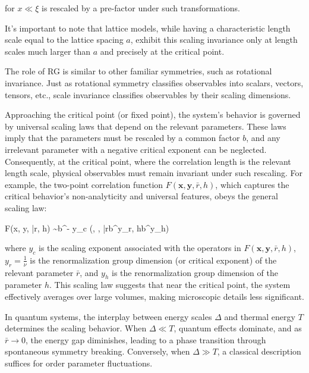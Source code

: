 for $ x \ll \xi $ is rescaled by a pre-factor under such transformations.


It's important to note that lattice models, while having a characteristic length scale equal to the lattice spacing $ a $, exhibit this scaling invariance only at length scales much larger than $ a $ and precisely at the critical point.


The role of RG is similar to other familiar symmetries, such as rotational invariance. Just as rotational symmetry classifies observables into scalars, vectors, tensors, etc., scale invariance classifies observables by their scaling dimensions.

Approaching the critical point (or fixed point), the system's behavior is governed by universal scaling laws that depend on the relevant parameters. These laws imply that the parameters must be rescaled by a common factor $ b $, and any irrelevant parameter with a negative critical exponent can be neglected. Consequently, at the critical point, where the correlation length is the relevant length scale, physical observables must remain invariant under such rescaling. For example, the two-point correlation function $ F(\bm x, \bm y, \bar{r}, h) $, which captures the critical behavior's non-analyticity and universal features, obeys the general scaling law:

F(\bm x, \bm y, \bar{r}, h) \sim b^{- y_c} \left(, , \bar{r}b^{y_r}, hb^{y_h}\right)
\ea

where $ y_c $ is the scaling exponent associated with the operators in $ F(\bm x, \bm y, \bar{r}, h) $, $ y_r = \frac{1}{\nu} $ is the renormalization group dimension (or critical exponent) of the relevant parameter $ \bar{r} $, and $ y_h $ is the renormalization group dimension of the parameter $ h $. This scaling law suggests that near the critical point, the system effectively averages over large volumes, making microscopic details less significant.

$ $\\

In quantum systems, the interplay between energy scales $ \Delta $ and thermal energy $ T $ determines the scaling behavior. When $ \Delta \ll T $, quantum effects dominate, and as $ \bar{r} \rightarrow 0 $, the energy gap diminishes, leading to a phase transition through spontaneous symmetry breaking. Conversely, when $ \Delta \gg T $, a classical description suffices for order parameter fluctuations.

